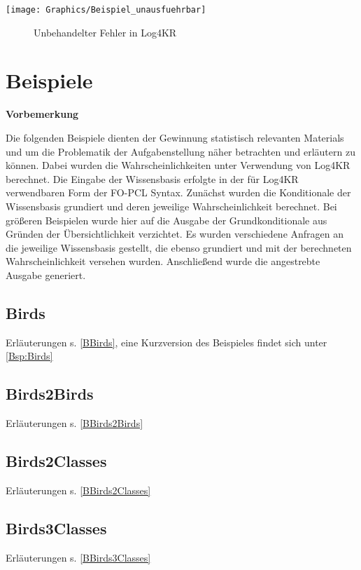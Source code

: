 \documentclass[draft]{scrreprt}
\begin{document}
{\texttt{[image: Graphics/Beispiel\_unausfuehrbar]}
\begin{figure}[h]
	\caption{Unbehandelter Fehler in Log4KR}
\end{figure}




\chapter{Beispiele}
\label{examples}

\textbf{Vorbemerkung}

\noindent
Die folgenden Beispiele dienten der Gewinnung statistisch relevanten Materials und um die Problematik der Aufgabenstellung näher betrachten und erläutern zu können. Dabei wurden die Wahrscheinlichkeiten unter Verwendung von Log4KR berechnet. Die Eingabe der Wissensbasis erfolgte in der für Log4KR verwendbaren Form der FO-PCL Syntax. Zunächst wurden die Konditionale der Wissensbasis grundiert und deren jeweilige Wahrscheinlichkeit berechnet. Bei größeren Beispielen wurde hier auf die Ausgabe der Grundkonditionale aus Gründen der Übersichtlichkeit verzichtet.
Es wurden verschiedene Anfragen an die jeweilige Wissensbasis gestellt, die ebenso grundiert und mit der berechneten Wahrscheinlichkeit versehen wurden.
Anschließend wurde die angestrebte Ausgabe  generiert. 

\section{Birds} Erläuterungen s. \ref{BBirds}, eine Kurzversion des Beispieles findet sich unter \ref{Bsp:Birds}
\label{Birds}

\newpage

\section{Birds2Birds} Erläuterungen s. \ref{BBirds2Birds}
\label{Birds2Birds}

\newpage

\section{Birds2Classes} Erläuterungen s. \ref{BBirds2Classes}
\label{Birds2Classes}

\newpage

\section{Birds3Classes} Erläuterungen s. \ref{BBirds3Classes}
\label{Birds3Classes}

\newpage

}
\end{document}
